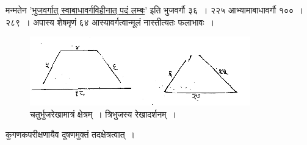 \documentclass[11pt, openany]{book}
\begin{document}
\vspace{-2mm}
 मन्मतेन '\hyperref[4.38]{भुजवर्गात् स्वाबाधावर्गविहीनात् पदं लम्बः}' इति भुजवर्गौ ३६~। २२५ आभ्यामाबाधावर्गौ १००~। २८९~। अपास्य शेषमृणं
६४ आस्यावर्गत्वान्मूलं नास्तीत्यतः फलाभावः~। 
\begin{figure}[h!]
    \centering
    \captionsetup{labelformat=empty}
    \caption{ चतुर्भुजरेखामात्रं क्षेत्रम्~।\hspace{3cm} त्रिभुजस्य रेखादर्शनम्~।\hspace{-2cm}}
    \vspace{-2mm}
    \includegraphics[scale=0.85]{graphics/capture48.png}
\end{figure}
    \vspace{-2mm}
  
 कुगणकपरीक्षणायैव दूषणमुक्तं तदक्षेत्रत्वात्~। \\
\end{document}
